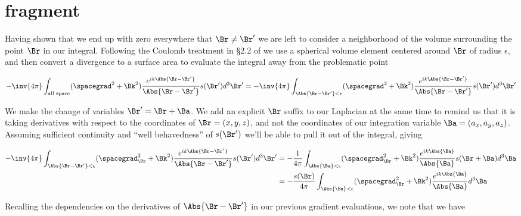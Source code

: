 
%

\chapter{fragment}

\beginArtNoToc

Having shown that we end up with zero everywhere that $\Br \ne \Br'$ we are left to consider a neighborhood of the volume surrounding the point $\Br$ in our integral.  Following the Coulomb treatment in \S 2.2 of \cite{schwartz1987pe} we use a spherical volume element centered around $\Br$ of radius $\epsilon$, and then convert a divergence to a surface area to evaluate the integral away from the problematic point

\begin{equation}\label{eqn:shortTimeDepPertubation:n}
-\inv{4\pi} \int_{\text{all space}} (\spacegrad^2 + \Bk^2) \frac{e^{i k \Abs{\Br - \Br'}}}{\Abs{\Br - \Br'}} s(\Br') d^3 \Br'
=
-\inv{4\pi} \int_{\Abs{\Br - \Br'} < \epsilon} (\spacegrad^2 + \Bk^2) \frac{e^{i k \Abs{\Br - \Br'}}}{\Abs{\Br - \Br'}} s(\Br') d^3 \Br'
\end{equation}

We make the change of variables $\Br' = \Br + \Ba$.  We add an explicit $\Br$ suffix to our Laplacian at the same time to remind us that it is taking derivatives with respect to the coordinates of $\Br = (x, y, z)$, and not the coordinates of our integration variable $\Ba = (a_x, a_y, a_z)$.  Assuming sufficient continuity and ``well behavedness'' of $s(\Br')$ we'll be able to pull it out of the integral, giving

\begin{align*}
-\inv{4\pi} \int_{\Abs{\Br - \Br'} < \epsilon} (\spacegrad_\Br^2 + \Bk^2) \frac{e^{i k \Abs{\Br - \Br'}}}{\Abs{\Br - \Br'}} s(\Br') d^3 \Br'
&= 
-\frac{1}{4\pi} \int_{\Abs{\Ba} < \epsilon} (\spacegrad_\Br^2 + \Bk^2) \frac{e^{i k \Abs{\Ba}}}{\Abs{\Ba}} s(\Br + \Ba) d^3 \Ba \\
&= 
-\frac{s(\Br)}{4\pi} \int_{\Abs{\Ba} < \epsilon} (\spacegrad_\Br^2 + \Bk^2) \frac{e^{i k \Abs{\Ba}}}{\Abs{\Ba}} d^3 \Ba 
\end{align*}

Recalling the dependencies on the derivatives of $\Abs{\Br - \Br'}$ in our previous gradient evaluations, we note that we have

